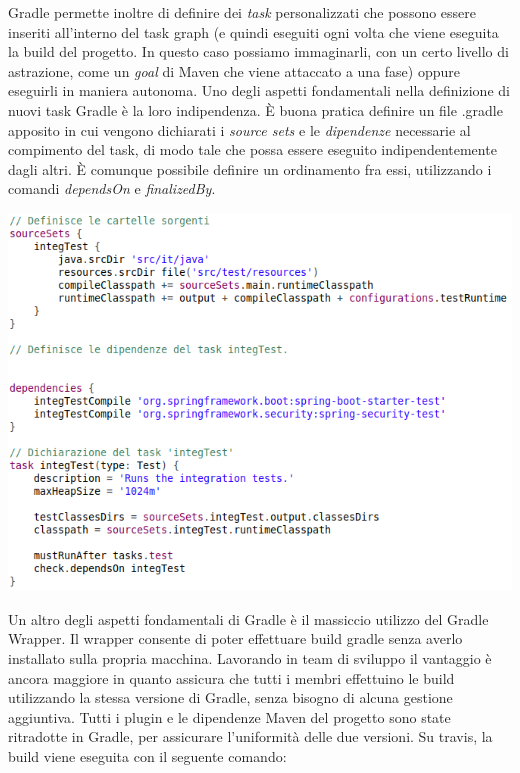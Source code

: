\pagebreak
Gradle permette inoltre di definire dei \textsl{task} personalizzati che possono essere inseriti all'interno del task graph (e quindi eseguiti ogni volta che viene eseguita la build del progetto. In questo caso possiamo immaginarli, con un certo livello di astrazione, come un \textsl{goal} di Maven che viene attaccato a una fase) oppure eseguirli in maniera autonoma.\newline\newline
Uno degli aspetti fondamentali nella definizione di nuovi task Gradle è la loro indipendenza. È buona pratica definire un file .gradle apposito in cui vengono dichiarati i \textsl{source sets} e le \textsl{dipendenze} necessarie al compimento del task, di modo tale che possa essere eseguito indipendentemente dagli altri.
È comunque possibile definire un ordinamento fra essi, utilizzando i comandi \textsl{dependsOn} e \textsl{finalizedBy}.\newline\newline
\vspace{1cm}
\begin{minipage}{\linewidth}
	\includegraphics[width=\textwidth]{img/itest-gradle.png}
\end{minipage}
\newline\newline
Un altro degli aspetti fondamentali di Gradle è il massiccio utilizzo del Gradle Wrapper.\newline
Il wrapper consente di poter effettuare build gradle senza averlo installato sulla propria macchina. Lavorando in team di sviluppo il vantaggio è ancora maggiore in quanto assicura che tutti i membri effettuino le build utilizzando la stessa versione di Gradle, senza bisogno di alcuna gestione aggiuntiva.\newline\newline
Tutti i plugin e le dipendenze Maven del progetto sono state ritradotte in Gradle, per assicurare l'uniformità delle due versioni. Su travis, la build viene eseguita con il seguente comando:\newline

